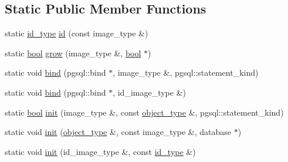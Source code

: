 \subsection*{Static Public Member Functions}
\begin{DoxyCompactItemize}
\item 
static \hyperlink{classodb_1_1access_1_1object__traits_3_01_1_1_object_class_01_4_ad099d55d95356877555ff87c5d99e370}{id\+\_\+type} \hyperlink{classodb_1_1access_1_1object__traits__impl_3_01_1_1_object_class_00_01id__pgsql_01_4_a7bca16becde846f2603df42e5feb0246}{id} (const image\+\_\+type \&)
\item 
static \hyperlink{classodb_1_1access_1_1object__traits_3_01_1_1_object_class_01_4_a1f9680cb812834a08dfbf195bd41a057}{bool} \hyperlink{classodb_1_1access_1_1object__traits__impl_3_01_1_1_object_class_00_01id__pgsql_01_4_a6175c46692981ed57049029bf764345d}{grow} (image\+\_\+type \&, \hyperlink{classodb_1_1access_1_1object__traits_3_01_1_1_object_class_01_4_a1f9680cb812834a08dfbf195bd41a057}{bool} $\ast$)
\item 
static void \hyperlink{classodb_1_1access_1_1object__traits__impl_3_01_1_1_object_class_00_01id__pgsql_01_4_a5dd3d65482459d3209340f4084d61ee7}{bind} (pgsql\+::bind $\ast$, image\+\_\+type \&, pgsql\+::statement\+\_\+kind)
\item 
static void \hyperlink{classodb_1_1access_1_1object__traits__impl_3_01_1_1_object_class_00_01id__pgsql_01_4_a6cd0d32d0a7dd050f3329e9a2a23360c}{bind} (pgsql\+::bind $\ast$, id\+\_\+image\+\_\+type \&)
\item 
static \hyperlink{classodb_1_1access_1_1object__traits_3_01_1_1_object_class_01_4_a1f9680cb812834a08dfbf195bd41a057}{bool} \hyperlink{classodb_1_1access_1_1object__traits__impl_3_01_1_1_object_class_00_01id__pgsql_01_4_a4bc2b0b5bfd35be5babc57f7e92bf5a7}{init} (image\+\_\+type \&, const \hyperlink{classodb_1_1access_1_1object__traits_3_01_1_1_object_class_01_4_ace038dbac6a8699ff387d2de36db3f85}{object\+\_\+type} \&, pgsql\+::statement\+\_\+kind)
\item 
static void \hyperlink{classodb_1_1access_1_1object__traits__impl_3_01_1_1_object_class_00_01id__pgsql_01_4_ae0b7dfcf980807355de5c187636dc22e}{init} (\hyperlink{classodb_1_1access_1_1object__traits_3_01_1_1_object_class_01_4_ace038dbac6a8699ff387d2de36db3f85}{object\+\_\+type} \&, const image\+\_\+type \&, database $\ast$)
\item 
static void \hyperlink{classodb_1_1access_1_1object__traits__impl_3_01_1_1_object_class_00_01id__pgsql_01_4_af86a99bea44ab9915656740a0498c2cf}{init} (id\+\_\+image\+\_\+type \&, const \hyperlink{classodb_1_1access_1_1object__traits_3_01_1_1_object_class_01_4_ad099d55d95356877555ff87c5d99e370}{id\+\_\+type} \&)

\end{DoxyCompactItemize}
